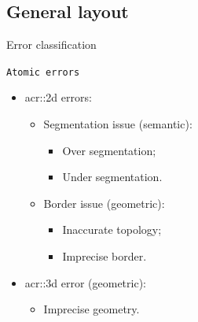 \documentclass[10pt]{beamer}
\begin{document}
        \subsection{General layout}
            \begin{frame}{Error classification}
                
            \end{frame}

            \begin{frame}{\texttt{Atomic errors}}
                \begin{itemize}[label=\(\blacktriangleright\), font=\color{IGNGreen}, itemsep=2em]
                    \item<1-> \Acrfull{acr::2d} errors:
                        \begin{itemize}[label=\(\blacktriangleright\), font=\color{IGNGreen}]
                            \item<2-> Segmentation issue (semantic):
                                \begin{itemize}
                                    \item<3-> Over segmentation;
                                    \item<4-> Under segmentation.      
                                \end{itemize}
                            \item<5-> Border issue (geometric):
                            \begin{itemize}
                                \item<6-> Inaccurate topology;
                                \item<7-> Imprecise border.      
                            \end{itemize}
                        \end{itemize}
                    \item<8-> \gls{acr::3d} error (geometric):
                        \begin{itemize}[label=\(\blacktriangleright\), font=\color{IGNGreen}]
                            \item<9-> Imprecise geometry.
                        \end{itemize}
                \end{itemize}
            \end{frame}
\end{document}
